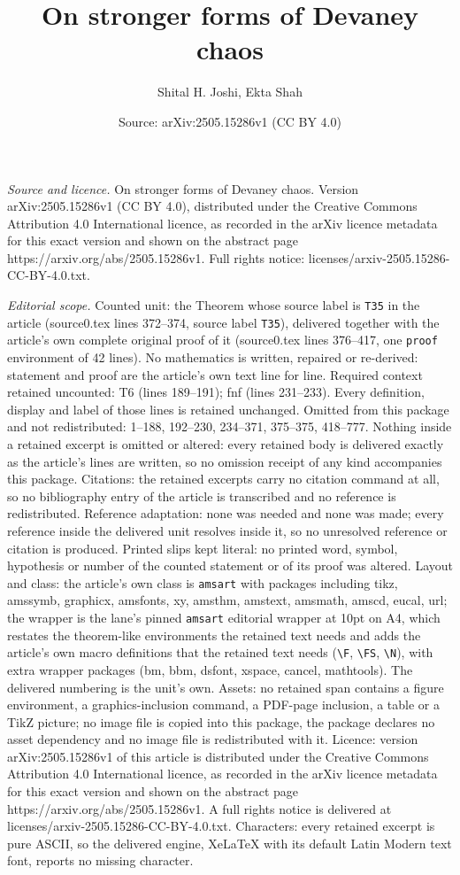 \documentclass[10pt,a4paper]{amsart}
\title[On stronger forms of Devaney chaos]{On stronger forms of Devaney chaos}
\author{Shital H. Joshi, Ekta Shah}
\date{Source: arXiv:2505.15286v1 (CC BY 4.0)}
\begin{document}
\maketitle

\noindent\emph{Source and licence.} On stronger forms of Devaney chaos. Version arXiv:2505.15286v1 (CC BY 4.0), distributed under the Creative Commons Attribution 4.0 International licence, as recorded in the arXiv licence metadata for this exact version and shown on the abstract page https://arxiv.org/abs/2505.15286v1. Full rights notice: licenses/arxiv-2505.15286-CC-BY-4.0.txt.\par\smallskip

\noindent\textit{Editorial scope.} Counted unit: the Theorem whose source label is \texttt{T35} in the article (source0.tex lines 372--374, source label \texttt{T35}), delivered together with the article's own complete original proof of it (source0.tex lines 376--417, one \texttt{proof} environment of 42 lines). No mathematics is written, repaired or re-derived: statement and proof are the article's own text line for line. Required context retained uncounted: T6 (lines 189--191); fnf (lines 231--233). Every definition, display and label of those lines is retained unchanged. Omitted from this package and not redistributed: 1--188, 192--230, 234--371, 375--375, 418--777. Nothing inside a retained excerpt is omitted or altered: every retained body is delivered exactly as the article's lines are written, so no omission receipt of any kind accompanies this package. Citations: the retained excerpts carry no citation command at all, so no bibliography entry of the article is transcribed and no reference is redistributed. Reference adaptation: none was needed and none was made; every reference inside the delivered unit resolves inside it, so no unresolved reference or citation is produced. Printed slips kept literal: no printed word, symbol, hypothesis or number of the counted statement or of its proof was altered. Layout and class: the article's own class is \texttt{amsart} with packages including tikz, amssymb, graphicx, amsfonts, xy, amsthm, amstext, amsmath, amscd, eucal, url; the wrapper is the lane's pinned \texttt{amsart} editorial wrapper at 10pt on A4, which restates the theorem-like environments the retained text needs and adds the article's own macro definitions that the retained text needs (\texttt{\textbackslash F}, \texttt{\textbackslash FS}, \texttt{\textbackslash N}), with extra wrapper packages (bm, bbm, dsfont, xspace, cancel, mathtools). The delivered numbering is the unit's own. Assets: no retained span contains a figure environment, a graphics-inclusion command, a PDF-page inclusion, a table or a TikZ picture; no image file is copied into this package, the package declares no asset dependency and no image file is redistributed with it. Licence: version arXiv:2505.15286v1 of this article is distributed under the Creative Commons Attribution 4.0 International licence, as recorded in the arXiv licence metadata for this exact version and shown on the abstract page https://arxiv.org/abs/2505.15286v1. A full rights notice is delivered at licenses/arxiv-2505.15286-CC-BY-4.0.txt. Characters: every retained excerpt is pure ASCII, so the delivered engine, XeLaTeX with its default Latin Modern text font, reports no missing character.
\end{document}
